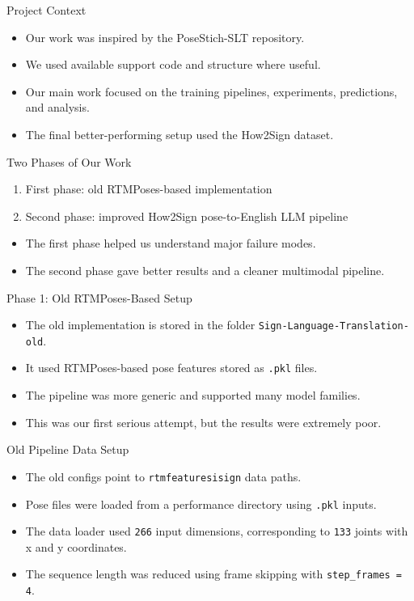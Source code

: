 \documentclass[aspectratio=169]{beamer}
\begin{document}
\begin{frame}{Project Context}
\begin{itemize}
  \item Our work was inspired by the PoseStich-SLT repository.
  \item We used available support code and structure where useful.
  \item Our main work focused on the training pipelines, experiments, predictions, and analysis.
  \item The final better-performing setup used the How2Sign dataset.
\end{itemize}
\end{frame}

\begin{frame}{Two Phases of Our Work}
\begin{enumerate}
  \item First phase: old RTMPoses-based implementation
  \item Second phase: improved How2Sign pose-to-English LLM pipeline
\end{enumerate}
\vspace{0.5em}
\begin{itemize}
  \item The first phase helped us understand major failure modes.
  \item The second phase gave better results and a cleaner multimodal pipeline.
\end{itemize}
\end{frame}

\begin{frame}{Phase 1: Old RTMPoses-Based Setup}
\begin{itemize}
  \item The old implementation is stored in the folder \texttt{Sign-Language-Translation-old}.
  \item It used RTMPoses-based pose features stored as \texttt{.pkl} files.
  \item The pipeline was more generic and supported many model families.
  \item This was our first serious attempt, but the results were extremely poor.
\end{itemize}
\end{frame}

\begin{frame}{Old Pipeline Data Setup}
\begin{itemize}
  \item The old configs point to \texttt{rtmfeaturesisign} data paths.
  \item Pose files were loaded from a performance directory using \texttt{.pkl} inputs.
  \item The data loader used \texttt{266} input dimensions, corresponding to \texttt{133} joints with x and y coordinates.
  \item The sequence length was reduced using frame skipping with \texttt{step\_frames = 4}.
\end{itemize}
\end{frame}
\end{document}
